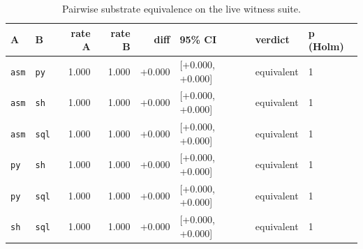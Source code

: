 \documentclass[11pt,a4paper]{article}
\begin{document}
\begin{table}[h]\centering\small
\caption{Pairwise substrate equivalence on the live witness suite.}
\label{tab:subequiv}
\begin{tabular}{llrrrlll}
\toprule
A & B & rate A & rate B & diff & 95\% CI & verdict & p (Holm) \\
\midrule
\texttt{asm} & \texttt{py} & 1.000 & 1.000 & +0.000 & [+0.000, +0.000] & equivalent & 1 \\
\texttt{asm} & \texttt{sh} & 1.000 & 1.000 & +0.000 & [+0.000, +0.000] & equivalent & 1 \\
\texttt{asm} & \texttt{sql} & 1.000 & 1.000 & +0.000 & [+0.000, +0.000] & equivalent & 1 \\
\texttt{py} & \texttt{sh} & 1.000 & 1.000 & +0.000 & [+0.000, +0.000] & equivalent & 1 \\
\texttt{py} & \texttt{sql} & 1.000 & 1.000 & +0.000 & [+0.000, +0.000] & equivalent & 1 \\
\texttt{sh} & \texttt{sql} & 1.000 & 1.000 & +0.000 & [+0.000, +0.000] & equivalent & 1 \\
\bottomrule
\end{tabular}
\end{table}
\end{document}
